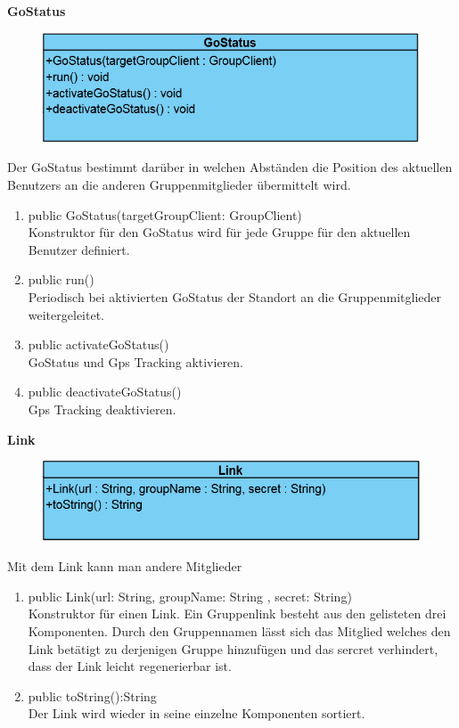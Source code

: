 \textbf{GoStatus}
\begin{figure}[H]
	\includegraphics[scale = .5]{res/umlClasses/GoStatus.png}
	\centering
\end{figure}
Der GoStatus bestimmt darüber in welchen Abständen die Position des aktuellen Benutzers an die anderen Gruppenmitglieder übermittelt wird.
\begin{enumerate}
	\item public GoStatus(targetGroupClient: GroupClient)\\
		Konstruktor für den GoStatus wird für jede Gruppe für den aktuellen Benutzer definiert.
	\item public run()\\
		Periodisch bei aktivierten GoStatus der Standort an die Gruppenmitglieder weitergeleitet.
	\item public activateGoStatus()\\
		GoStatus und Gps Tracking aktivieren.
	\item public deactivateGoStatus()\\
		Gps Tracking deaktivieren.
\end{enumerate}

\textbf{Link}
\begin{figure}[H]
	\includegraphics[scale = .5]{res/umlClasses/Link.png}
	\centering
\end{figure}
Mit dem Link kann man andere Mitglieder 
\begin{enumerate}
	\item public Link(url: String, groupName: String , secret: String)\\
		Konstruktor für einen Link. Ein Gruppenlink besteht aus den gelisteten drei Komponenten. Durch den Gruppennamen lässt sich das Mitglied welches den Link betätigt zu derjenigen Gruppe hinzufügen und das sercret verhindert, dass der Link leicht regenerierbar ist.
	\item public toString():String\\
		Der Link wird wieder in seine einzelne Komponenten sortiert.
\end{enumerate}

